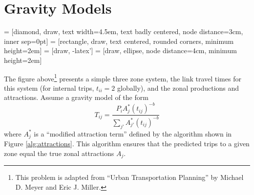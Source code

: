 
\section{Gravity Models}
\label{sec:gravity}

 = [diamond, draw, 
    text width=4.5em, text badly centered, node distance=3cm, inner sep=0pt]
 = [rectangle, draw, 
   text centered, rounded corners, minimum height=2em]
 = [draw, -latex']
 = [draw, ellipse, node distance=4cm,
    minimum height=2em]
\begin{center}
\end{center}
The figure above\footnote{This problem is adapted from ``Urban Transportation
Planning'' by Michael D. Meyer and Eric J. Miller.} presents a simple three zone
system, the link travel times for this system (for internal trips, $t_{ii}=2$
globally), and the zonal productions and attractions. Assume a gravity model of
the form
\begin{equation}
 T_{ij}=\dfrac{P_iA_j^*(t_{ij})^{-b}}{\sum_{j'}A^*_{j'}(t_{ij})^{-b}}
\end{equation}
where $A_j^*$ is a ``modified attraction term'' defined by the
algorithm shown in Figure \ref{alg:attractions}. This algorithm ensures that
the predicted trips to a given zone equal the true zonal attractions
$A_j$. 


